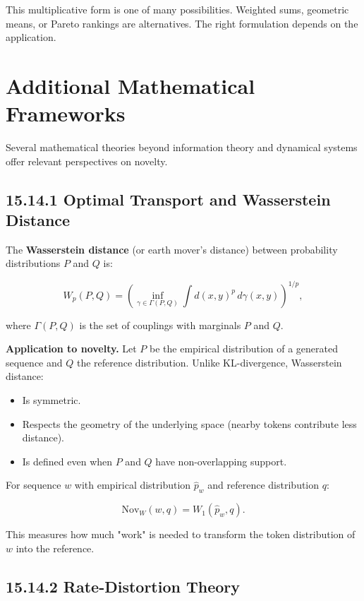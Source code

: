 \begin{remark}
This multiplicative form is one of many possibilities. Weighted sums, geometric means, or Pareto rankings are alternatives. The right formulation depends on the application.
\end{remark}



\section{Additional Mathematical Frameworks}

Several mathematical theories beyond information theory and dynamical systems offer relevant perspectives on novelty.

\subsection{15.14.1 Optimal Transport and Wasserstein Distance}

The \textbf{Wasserstein distance} (or earth mover's distance) between probability distributions $P$ and $Q$ is:

\[W_p(P, Q) = \left( \inf_{\gamma \in \Gamma(P, Q)} \int d(x, y)^p \, d\gamma(x, y) \right)^{1/p},\]

where $\Gamma(P, Q)$ is the set of couplings with marginals $P$ and $Q$.

\textbf{Application to novelty.} Let $P$ be the empirical distribution of a generated sequence and $Q$ the reference distribution. Unlike KL-divergence, Wasserstein distance:
\begin{itemize}
\item Is symmetric.
\item Respects the geometry of the underlying space (nearby tokens contribute less distance).
\item Is defined even when $P$ and $Q$ have non-overlapping support.
\end{itemize}

\begin{definition}
For sequence $w$ with empirical distribution $\hat{p}_w$ and reference distribution $q$:

\[\mathrm{Nov}_W(w, q) = W_1(\hat{p}_w, q).\]

This measures how much "work" is needed to transform the token distribution of $w$ into the reference.
\end{definition}

\subsection{15.14.2 Rate-Distortion Theory}

